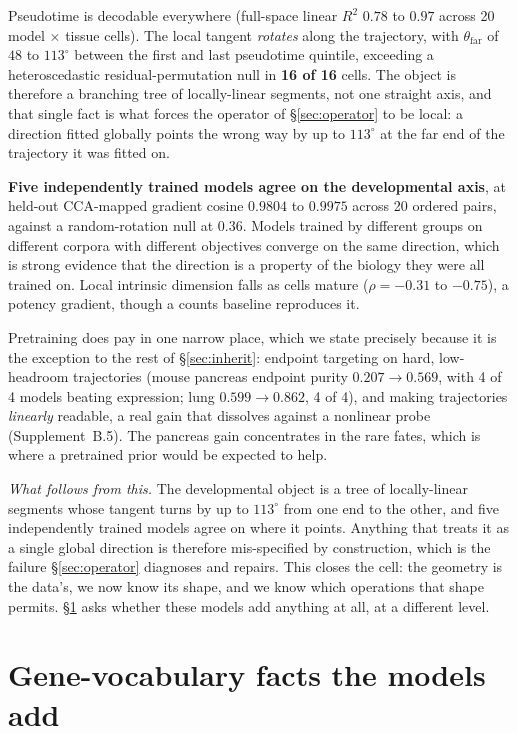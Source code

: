 \documentclass[11pt]{article}
\begin{document}
Pseudotime is decodable everywhere (full-space linear $R^2$ $0.78$ to $0.97$ across 20 model $\times$
tissue cells). The local tangent \emph{rotates} along the trajectory, with $\theta_{\text{far}}$ of
$48$ to $113^\circ$ between the first and last pseudotime quintile, exceeding a heteroscedastic
residual-permutation null in \textbf{16 of 16} cells. The object is therefore a branching tree of
locally-linear segments, not one straight axis, and that single fact is what forces the operator
of \S\ref{sec:operator} to be local: a direction fitted globally points the wrong way by up to
$113^\circ$ at the far end of the trajectory it was fitted on.

\textbf{Five independently trained models agree on the developmental axis}, at held-out CCA-mapped
gradient cosine $0.9804$ to $0.9975$ across 20 ordered pairs, against a random-rotation null at $0.36$.
Models trained by different groups on different corpora with different objectives converge on the same
direction, which is strong evidence that the direction is a property of the biology they were all
trained on. Local intrinsic dimension falls as cells mature ($\rho=-0.31$ to $-0.75$), a potency
gradient, though a counts baseline reproduces it.

Pretraining does pay in one narrow place, which we state precisely because it is the exception to the
rest of \S\ref{sec:inherit}: endpoint targeting on hard, low-headroom trajectories (mouse
pancreas endpoint purity $0.207 \to 0.569$, with 4 of 4 models beating expression; lung $0.599 \to
0.862$, 4 of 4), and making trajectories \emph{linearly} readable, a real gain that dissolves against a
nonlinear probe (Supplement~B.5). The pancreas gain concentrates in the rare fates, which is where a
pretrained prior would be expected to help.

\emph{What follows from this.} The developmental object is a tree of locally-linear segments whose
tangent turns by up to $113^\circ$ from one end to the other, and five independently trained models
agree on where it points. Anything that treats it as a single global direction is therefore mis-specified
by construction, which is the failure \S\ref{sec:operator} diagnoses and repairs. This closes the cell:
the geometry is the data's, we now know its shape, and we know which operations that shape permits.
\S\ref{sec:add} asks whether these models add anything at all, at a different level.

\section{Gene-vocabulary facts the models add}\label{sec:add}
\end{document}

